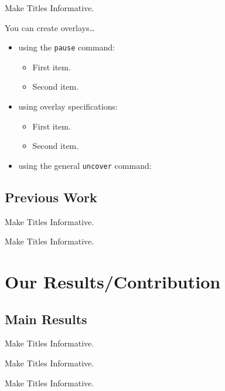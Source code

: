 \documentclass{beamer}
\begin{document}
\begin{frame}{Make Titles Informative.}

  You can create overlays\dots
  \begin{itemize}
  \item using the \texttt{pause} command:
    \begin{itemize}
    \item
      First item.
      \pause
    \item    
      Second item.
    \end{itemize}
  \item
    using overlay specifications:
    \begin{itemize}
    \item<3->
      First item.
    \item<4->
      Second item.
    \end{itemize}
  \item
    using the general \texttt{uncover} command:
    \begin{itemize}
    \end{itemize}
  \end{itemize}
\end{frame}


\subsection{Previous Work}

\begin{frame}{Make Titles Informative.}
\end{frame}
\begin{frame}{Make Titles Informative.}
\end{frame}



\section{Our Results/Contribution}

\subsection{Main Results}

\begin{frame}{Make Titles Informative.}
\end{frame}
\begin{frame}{Make Titles Informative.}
\end{frame}
\begin{frame}{Make Titles Informative.}
\end{frame}
\end{document}
